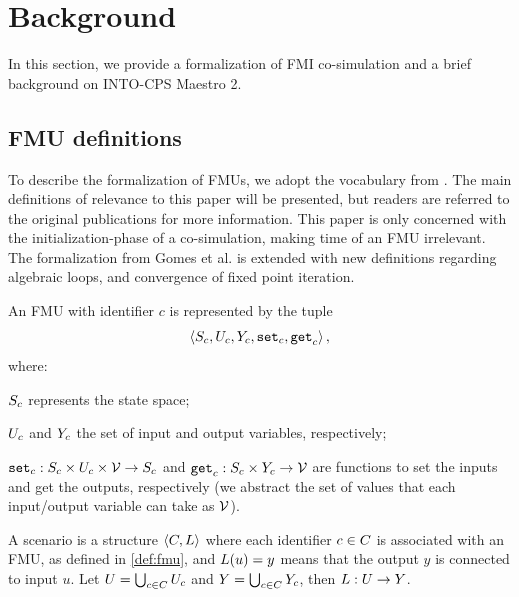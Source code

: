 \section{Background}\label{sc:background}
In this section, we provide a formalization of FMI co-simulation and a brief background on INTO-CPS Maestro 2.

\subsection{FMU definitions}
To describe the formalization of FMUs, we adopt the vocabulary from \cite{gomes_lucio_vangheluwe_2019}. The main definitions of relevance to this paper will be presented, but readers are referred to the original publications for more information. This paper is only concerned with the initialization-phase of a co-simulation, making time of an FMU irrelevant. The formalization from Gomes et al. is extended with new definitions regarding algebraic loops, and convergence of fixed point iteration.
\begin{definition}[FMU]\label{def:fmu}
  An FMU with identifier $c$ is represented by the tuple   
  $$ \left\langle S_{c}, U_{c}, Y_{c}, \mathtt{set}_{c}, \mathtt{get}_{c} \right\rangle ,$$
  where:
  \begin{inparadesc}
    \item $S_{c}$ represents the state space;
    \item $U_{c}$ and $Y_{c}$ the set of input and output variables, respectively;
    \item $\mathtt{set}_{c} : S_{c} \times U_{c} \times \mathcal{V} \to S_{c}$ and $\mathtt{get}_{c}: S_{c} \times Y_{c} \to \mathcal{V}$ are functions to set the inputs and get the outputs, respectively (we abstract the set of values that each input/output variable can take as $\mathcal{V}$).
  \end{inparadesc}
\end{definition}

\begin{definition}[Scenario]\label{def:cosim_scenario}
  A scenario is a structure $ \left\langle C, L \right\rangle $ where each identifier $c \in C$ is associated with an FMU, as defined in \cref{def:fmu}, and $L(u)=y$ means that the output $y$ is connected to input $u$.
  Let $U = \bigcup_{c \in C} U_{c}$ and $Y = \bigcup_{c \in C} Y_{c}$, then $L : U \to Y$.
\end{definition}

